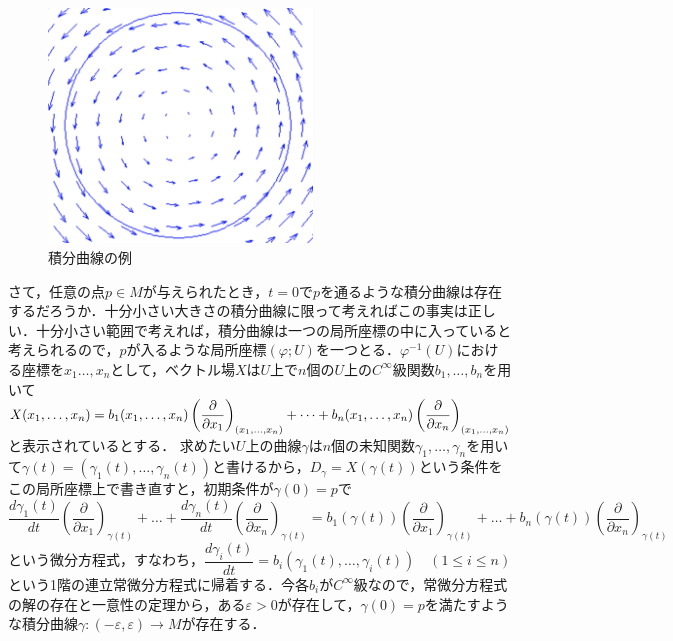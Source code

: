 \begin{figure}[h]
  \begin{center} 
    \includegraphics[width=7.0cm]{dev_vecfield}
    \caption{積分曲線の例}
  \end{center}
\end{figure}
さて，任意の点$p\in M$が与えられたとき，$t=0$で$p$を通るような積分曲線は存在するだろうか．十分小さい大きさの積分曲線に限って考えればこの事実は正しい．十分小さい範囲で考えれば，積分曲線は一つの局所座標の中に入っていると考えられるので，$p$が入るような局所座標$(\varphi;U)$を一つとる．$\varphi^{-1}(U)$における座標を$x_1\dots,x_n$として，ベクトル場$X$は$U$上で$n$個の$U$上の$C^\infty$級関数$b_1,\dots,b_n$を用いて$X(x_1,\dots,x_n)=b_1(x_1,\dots,x_n)\left(\dfrac{\partial}{\partial x_1}\right)_{(x_1,\dots,x_n)}+\dots+b_n(x_1,\dots,x_n)\left(\dfrac{\partial}{\partial x_n}\right)_{(x_1,\dots,x_n)}$と表示されているとする．
求めたい$U$上の曲線$\gamma$は$n$個の未知関数$\gamma_1,\dots,\gamma_n$を用いて$\gamma(t)=(\gamma_1(t),\dots,\gamma_n(t))$と書けるから，$D_\gamma=X(\gamma(t))$という条件をこの局所座標上で書き直すと，初期条件が$\gamma(0)=p$で
$$
\frac{d\gamma_1(t)}{dt}\left(\dfrac{\partial}{\partial x_1}\right)_{\gamma(t)}+\dots+\frac{d\gamma_n(t)}{dt}\left(\dfrac{\partial}{\partial x_n}\right)_{\gamma(t)}
=b_1(\gamma(t))\left(\dfrac{\partial}{\partial x_1}\right)_{\gamma(t)}+\dots+b_n(\gamma(t))\left(\dfrac{\partial}{\partial x_n}\right)_{\gamma(t)}
$$
という微分方程式，すなわち，$\dfrac{d\gamma_i(t)}{dt}=b_i(\gamma_1(t),\dots,\gamma_i(t))\quad(1\le i\le n)$という1階の連立常微分方程式に帰着する．今各$b_i$が$C^\infty$級なので，常微分方程式の解の存在と一意性の定理から，ある$\varepsilon>0$が存在して，$\gamma(0)=p$を満たすような積分曲線$\gamma:(-\varepsilon,\varepsilon)\rightarrow M$が存在する．


